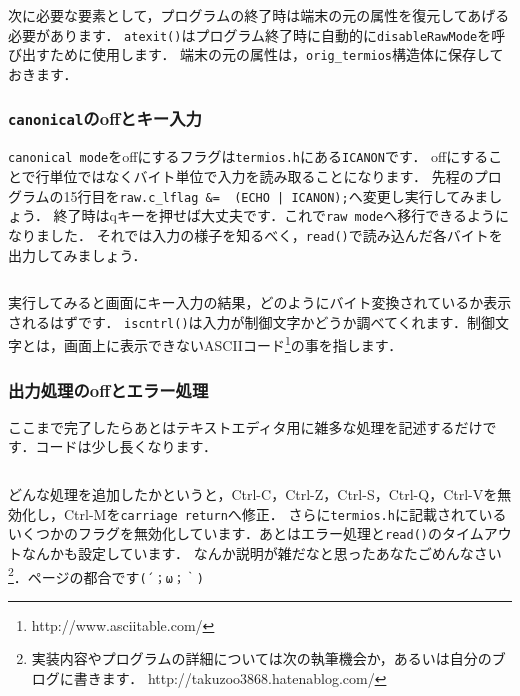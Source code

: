 次に必要な要素として，プログラムの終了時は端末の元の属性を復元してあげる必要があります．
\texttt{atexit()}はプログラム終了時に自動的に\texttt{disableRawMode}を呼び出すために使用します．
端末の元の属性は，\texttt{orig_termios}構造体に保存しておきます．

\subsubsection{\texttt{canonical}のoffとキー入力}
\texttt{canonical mode}をoffにするフラグは\texttt{termios.h}にある\texttt{ICANON}です．
offにすることで行単位ではなくバイト単位で入力を読み取ることになります．
先程のプログラムの15行目を\texttt{raw.c_lflag &= ~(ECHO | ICANON);}へ変更し実行してみましょう．
終了時はqキーを押せば大丈夫です．これで\texttt{raw mode}へ移行できるようになりました．
それでは入力の様子を知るべく，\texttt{read()}で読み込んだ各バイトを出力してみましょう．
\inputminted[frame=lines,framesep=2mm,baselinestretch=1.2,fontsize=\footnotesize,linenos,breaklines]{c}{\takuzooasset/step1_3.c}
実行してみると画面にキー入力の結果，どのようにバイト変換されているか表示されるはずです．
\texttt{iscntrl()}は入力が制御文字かどうか調べてくれます．制御文字とは，画面上に表示できないASCIIコード\footnote{http://www.asciitable.com/}の事を指します．

\subsubsection{出力処理のoffとエラー処理}
ここまで完了したらあとはテキストエディタ用に雑多な処理を記述するだけです．コードは少し長くなります．
\inputminted[frame=lines,framesep=2mm,baselinestretch=1.2,fontsize=\footnotesize,linenos,breaklines]{c}{\takuzooasset/step1_4.c}
どんな処理を追加したかというと，Ctrl-C，Ctrl-Z，Ctrl-S，Ctrl-Q，Ctrl-Vを無効化し，Ctrl-Mを\texttt{carriage return}へ修正．
さらに\texttt{termios.h}に記載されているいくつかのフラグを無効化しています．あとはエラー処理と\texttt{read()}のタイムアウトなんかも設定しています．
なんか説明が雑だなと思ったあなたごめんなさい\footnote{実装内容やプログラムの詳細については次の執筆機会か，あるいは自分のブログに書きます． http://takuzoo3868.hatenablog.com/}．ページの都合です\verb#(´；ω；｀)#

